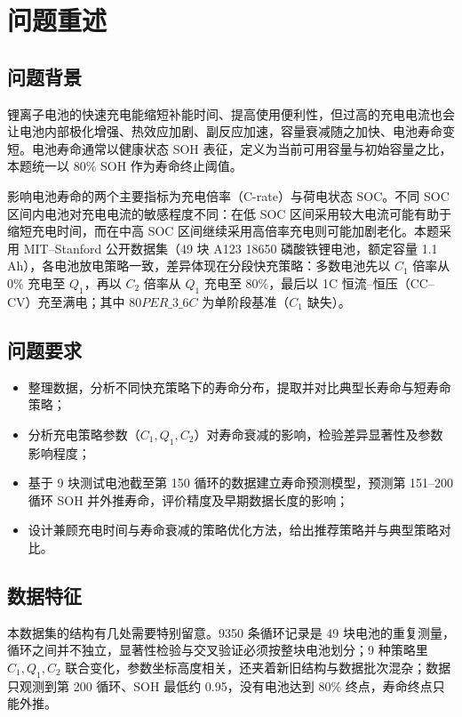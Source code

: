 \documentclass[withoutpreface,bwprint]{cumcmthesis}
\begin{document}
\pagestyle{plain}

\section{问题重述}
\subsection{问题背景}
锂离子电池的快速充电能缩短补能时间、提高使用便利性，但过高的充电电流也会让电池内部极化增强、热效应加剧、副反应加速，容量衰减随之加快、电池寿命变短。电池寿命通常以健康状态 SOH 表征，定义为当前可用容量与初始容量之比，本题统一以 80\% SOH 作为寿命终止阈值。

影响电池寿命的两个主要指标为充电倍率（C-rate）与荷电状态 SOC。不同 SOC 区间内电池对充电电流的敏感程度不同：在低 SOC 区间采用较大电流可能有助于缩短充电时间，而在中高 SOC 区间继续采用高倍率充电则可能加剧老化。本题采用 MIT--Stanford 公开数据集（49 块 A123 18650 磷酸铁锂电池，额定容量 1.1 Ah），各电池放电策略一致，差异体现在分段快充策略：多数电池先以 $C_1$ 倍率从 0\% 充电至 $Q_1$，再以 $C_2$ 倍率从 $Q_1$ 充电至 80\%，最后以 1C 恒流--恒压（CC--CV）充至满电；其中 $80PER\_3\_6C$ 为单阶段基准（$C_1$ 缺失）。

\subsection{问题要求}
\begin{itemize}
\item [(1)] 整理数据，分析不同快充策略下的寿命分布，提取并对比典型长寿命与短寿命策略；
\item [(2)] 分析充电策略参数（$C_1,Q_1,C_2$）对寿命衰减的影响，检验差异显著性及参数影响程度；
\item [(3)] 基于 9 块测试电池截至第 150 循环的数据建立寿命预测模型，预测第 151--200 循环 SOH 并外推寿命，评价精度及早期数据长度的影响；
\item [(4)] 设计兼顾充电时间与寿命衰减的策略优化方法，给出推荐策略并与典型策略对比。
\end{itemize}

\subsection{数据特征}
本数据集的结构有几处需要特别留意。9350 条循环记录是 49 块电池的重复测量，循环之间并不独立，显著性检验与交叉验证必须按整块电池划分；9 种策略里 $C_1,Q_1,C_2$ 联合变化，参数坐标高度相关，还夹着新旧结构与数据批次混杂；数据只观测到第 200 循环、SOH 最低约 0.95，没有电池达到 80\% 终点，寿命终点只能外推。
\end{document}
